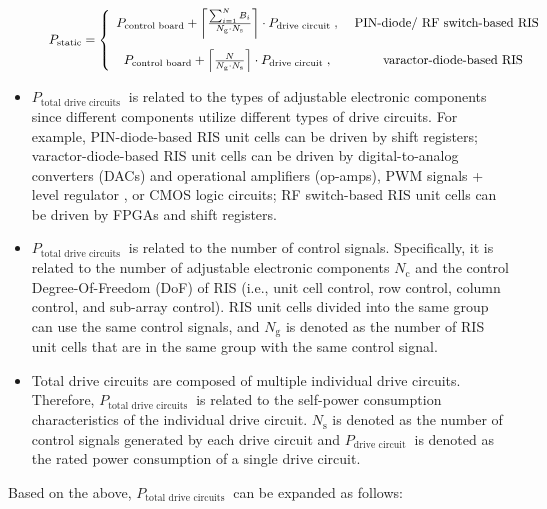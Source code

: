 \documentclass[journal]{IEEEtran}
\begin{document}
\begin{figure*}[!t]
\large
\begin{equation}
P_{\mathrm{static}}=\left\{\begin{array}{cc}
P_{\text {control board}}+\left\lceil\frac{\sum_{i=1}^N B_i}{N_{\text {g}} \cdot N_{\mathrm{s}}} \right\rceil \cdot P_{\text {drive circuit }}, & \text { PIN-diode/ RF switch-based RIS }  \vspace{0.3cm} \\
P_{\text {control board}}+\left\lceil\frac{N}{N_{\text {g}} \cdot N_{\mathrm{s}}} \right\rceil \cdot P_{\text {drive circuit }}, & \text { \quad varactor-diode-based RIS } 
\end{array}\right.
\end{equation}
\hrulefill
\vspace{-0.3cm}
\end{figure*}
\begin{itemize}
\item $P_{\text {total drive circuits }}$ is related to the types of adjustable electronic components since different components utilize different types of drive circuits. For example, PIN-diode-based RIS unit cells can be driven by shift registers; varactor-diode-based RIS unit cells can be driven by digital-to-analog converters (DACs) and operational amplifiers (op-amps), PWM signals + level regulator \cite{9551980}, or CMOS logic circuits; RF switch-based RIS unit cells can be driven by FPGAs and shift registers.
\item $P_{\text {total drive circuits }}$ is related to the number of control signals. Specifically, it is related to the number of adjustable electronic components $N_{\text {c}}$ and the control Degree-Of-Freedom (DoF) of RIS (i.e., unit cell control, row control, column control, and sub-array control). RIS unit cells divided into the same group can use the same control signals, and $N_{\text {g}}$ is denoted as the number of RIS unit cells that are in the same group with the same control signal.
\item Total drive circuits are composed of multiple individual drive circuits. Therefore, $P_{\text {total drive circuits }}$ is related to the self-power consumption characteristics of the individual drive circuit. $N_{\text {s}}$ is denoted as the number of control signals generated by each drive circuit and $P_{\text {drive circuit }}$ is denoted as the rated power consumption of a single drive circuit.
\end{itemize}
Based on the above, $P_{\text {total drive circuits }}$ can be expanded as follows:
\end{document}
